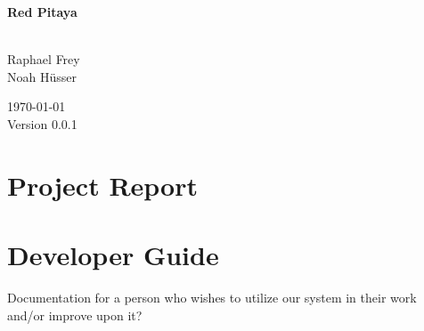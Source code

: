 \documentclass[a4paper,oneside]{alpenthesis/alpenthesis}
\begin{document}
\begin{titlingpage}
    \flushright\sffamily

    \vspace*{5em}
    \Huge\bfseries{Red Pitaya}\\[1ex]
    \Large{}\\[3ex]

    \normalsize\mdseries
    
    \vfill
    Raphael Frey\\
    Noah H\"usser\\[3ex]

    \vspace{5em}

    \today\\
    Version 0.0.1
\end{titlingpage} %

\frontmatter
\tableofcontents*
\clearpage
\listoffigures*
\clearpage
\listoftables*
\clearpage
\listoflistings
\clearpage

\mainmatter



\part{Project Report}
\label{part:project_report}





\part{Developer Guide}
\label{part:Developer_Guide}
Documentation for a person who wishes to utilize our system in their work and/or
improve upon it?
\end{document}
